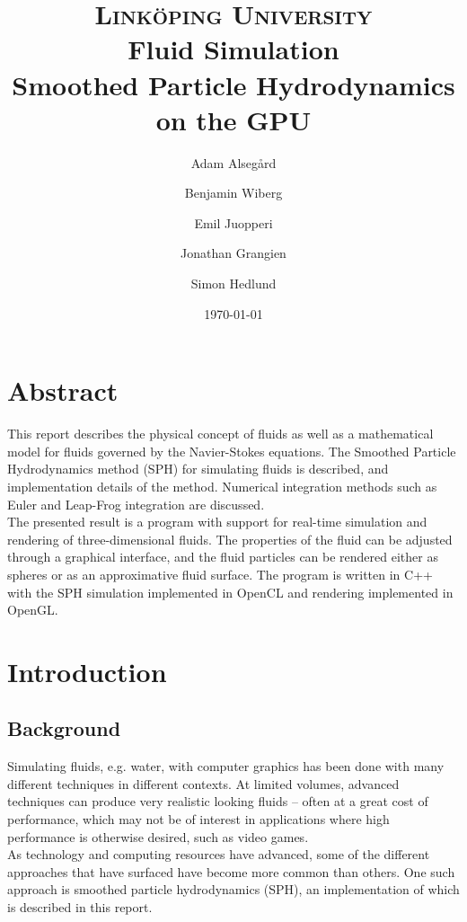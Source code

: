 \documentclass[paper=a4, fontsize=11pt]{report}
\title{
\normalfont \normalsize 
\textsc{Linköping University} \\ [25pt] %
\Huge Fluid Simulation\\
\LARGE Smoothed Particle Hydrodynamics on the GPU  \\
}
\author{Adam Alsegård \and Benjamin Wiberg \and Emil Juopperi \and Jonathan Grangien \and Simon Hedlund}
\date{\normalsize\today} %
\numberwithin{equation}{section} %
\numberwithin{figure}{section} %
\numberwithin{table}{section} %
\begin{document}
\maketitle 

\chapter*{Abstract}
This report describes the physical concept of fluids as well as a mathematical model for fluids governed by the Navier-Stokes equations. The Smoothed Particle Hydrodynamics method (SPH) for simulating fluids is described, and implementation details of the method. Numerical integration methods such as Euler and Leap-Frog integration are discussed. \\ 

The presented result is a program with support for real-time simulation and rendering of three-dimensional fluids. The properties of the fluid can be adjusted through a graphical interface, and the fluid particles can be rendered either as spheres or as an approximative fluid surface. The program is written in C++ with the SPH simulation implemented in OpenCL and rendering implemented in OpenGL.

\tableofcontents

\chapter{Introduction}
\section{Background}
Simulating fluids, e.g. water, with computer graphics has been done with many different techniques in different contexts. At limited volumes, advanced techniques can produce very realistic looking fluids -- often at a great cost of performance, which may not be of interest in applications where high performance is otherwise desired, such as video games. \\ 

As technology and computing resources have advanced, some of the different approaches that have surfaced have become more common than others. One such approach is smoothed particle hydrodynamics (SPH), an implementation of which is described in this report.

\end{document}
